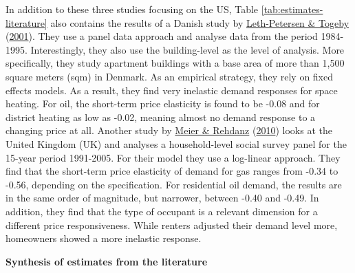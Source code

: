 \documentclass[12pt,twoside]{reedthesis}
\begin{document}
In addition to these three studies focusing on the US, Table \ref{tab:estimates-literature} also contains the results of a Danish study by \protect\hyperlink{ref-leth-petersen_togeby01}{Leth-Petersen \& Togeby} (\protect\hyperlink{ref-leth-petersen_togeby01}{2001}). They use a panel data approach and analyse data from the period 1984-1995. Interestingly, they also use the building-level as the level of analysis. More specifically, they study apartment buildings with a base area of more than 1,500 square meters (sqm) in Denmark. As an empirical strategy, they rely on fixed effects models. As a result, they find very inelastic demand responses for space heating. For oil, the short-term price elasticity is found to be -0.08 and for district heating as low as -0.02, meaning almost no demand response to a changing price at all. Another study by \protect\hyperlink{ref-meier_rehdanz10}{Meier \& Rehdanz} (\protect\hyperlink{ref-meier_rehdanz10}{2010}) looks at the United Kingdom (UK) and analyses a household-level social survey panel for the 15-year period 1991-2005. For their model they use a log-linear approach. They find that the short-term price elasticity of demand for gas ranges from -0.34 to -0.56, depending on the specification. For residential oil demand, the results are in the same order of magnitude, but narrower, between -0.40 and -0.49. In addition, they find that the type of occupant is a relevant dimension for a different price responsiveness. While renters adjusted their demand level more, homeowners showed a more inelastic response.

\textbf{Synthesis of estimates from the literature}
\end{document}

